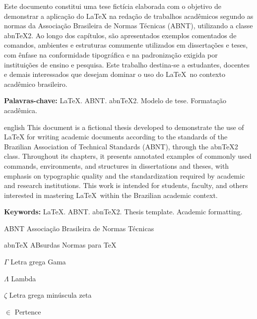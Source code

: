 \setlength{\absparsep}{18pt} %

\begin{resumo}
    Este documento constitui uma tese fictícia elaborada com o objetivo de demonstrar a aplicação do \LaTeX{} na redação de trabalhos acadêmicos segundo as normas da Associação Brasileira de Normas Técnicas (ABNT), utilizando a classe abn\TeX 2. Ao longo dos capítulos, são apresentados exemplos comentados de comandos, ambientes e estruturas comumente utilizados em dissertações e teses, com ênfase na conformidade tipográfica e na padronização exigida por instituições de ensino e pesquisa. Este trabalho destina-se a estudantes, docentes e demais interessados que desejam dominar o uso do \LaTeX\ no contexto acadêmico brasileiro.

    \textbf{Palavras-chave:} LaTeX. ABNT. abnTeX2. Modelo de tese. Formatação acadêmica.
\end{resumo}


\begin{resumo}[Abstract]
    \begin{otherlanguage*}{english}
        This document is a fictional thesis developed to demonstrate the use of \LaTeX{} for writing academic documents according to the standards of the Brazilian Association of Technical Standards (ABNT), through the abn\TeX 2 class. Throughout its chapters, it presents annotated examples of commonly used commands, environments, and structures in dissertations and theses, with emphasis on typographic quality and the standardization required by academic and research institutions. This work is intended for students, faculty, and others interested in mastering \LaTeX\ within the Brazilian academic context.

        \textbf{Keywords:} LaTeX. ABNT. abnTeX2. Thesis template. Academic formatting.
    \end{otherlanguage*}
\end{resumo}


\listoffigures*
\cleardoublepage

\listoftables*
\cleardoublepage


\begin{siglas}
    \item[ABNT] Associação Brasileira de Normas Técnicas
    \item[abnTeX] ABsurdas Normas para \TeX
\end{siglas}


\begin{simbolos}
    \item[$ \Gamma $] Letra grega Gama
    \item[$ \Lambda $] Lambda
    \item[$ \zeta $] Letra grega minúscula zeta
    \item[$ \in $] Pertence
\end{simbolos}


\tableofcontents*
\cleardoublepage


\textual
